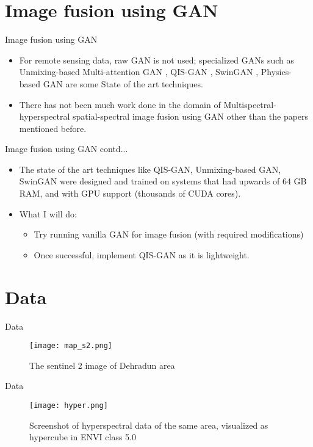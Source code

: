 \documentclass{beamer}
\begin{document}
\section{Image fusion using GAN}
\begin{frame}{Image fusion using GAN}
    \begin{itemize}
        \item For remote sensing data, raw GAN is not used; specialized GANs such as Unmixing-based Multi-attention GAN \cite{Su2023}, QIS-GAN \cite{Zhu2023}, SwinGAN \cite{Zhu2023a}, Physics-based GAN \cite{Xiao2021} are some State of the art techniques.
        \item There has not been much work done in the domain of Multispectral-hyperspectral spatial-spectral image fusion using GAN other than the papers mentioned before.
    \end{itemize}
\end{frame}
\begin{frame}{Image fusion using GAN contd...}
    \begin{itemize}
        \item The state of the art techniques like QIS-GAN, Unmixing-based GAN, SwinGAN were designed and trained on systems that had upwards of 64 GB RAM, and with GPU support (thousands of CUDA cores).
        \item What I will do:
        \begin{itemize}
            \item Try running vanilla GAN for image fusion (with required modifications)
            \item Once successful, implement QIS-GAN as it is lightweight.
        \end{itemize}
    \end{itemize}
\end{frame}
\section{Data}
\begin{frame}{Data}
    \begin{figure}
        \centering
        \texttt{[image: map\_s2.png]}
        \caption{The sentinel 2 image of Dehradun area}
        \label{fig:fig-2}
    \end{figure}
\end{frame}
\begin{frame}{Data}
    \begin{figure}
        \centering
        \texttt{[image: hyper.png]}
        \caption{Screenshot of hyperspectral data of the same area, visualized as hypercube in ENVI class 5.0}
        \label{fig:fig-3}
    \end{figure}
\end{frame}
\end{document}
